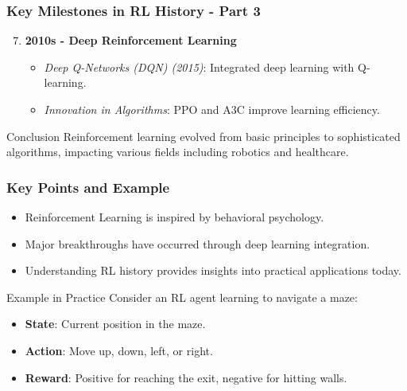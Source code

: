 \documentclass[aspectratio=169]{beamer}
\begin{document}
\begin{frame}[fragile]
    \frametitle{Key Milestones in RL History - Part 3}
    \begin{enumerate}
        \setcounter{enumi}{6}
        \item \textbf{2010s - Deep Reinforcement Learning}
            \begin{itemize}
                \item \textit{Deep Q-Networks (DQN) (2015)}: Integrated deep learning with Q-learning.
                \item \textit{Innovation in Algorithms}: PPO and A3C improve learning efficiency.
            \end{itemize}
    \end{enumerate}
    \begin{block}{Conclusion}
        Reinforcement learning evolved from basic principles to sophisticated algorithms, impacting various fields including robotics and healthcare.
    \end{block}
\end{frame}

\begin{frame}[fragile]
    \frametitle{Key Points and Example}
    \begin{itemize}
        \item Reinforcement Learning is inspired by behavioral psychology.
        \item Major breakthroughs have occurred through deep learning integration.
        \item Understanding RL history provides insights into practical applications today.
    \end{itemize}
    \begin{block}{Example in Practice}
        Consider an RL agent learning to navigate a maze:
        \begin{itemize}
            \item \textbf{State}: Current position in the maze.
            \item \textbf{Action}: Move up, down, left, or right.
            \item \textbf{Reward}: Positive for reaching the exit, negative for hitting walls.
        \end{itemize}
    \end{block}
\end{frame}
\end{document}
